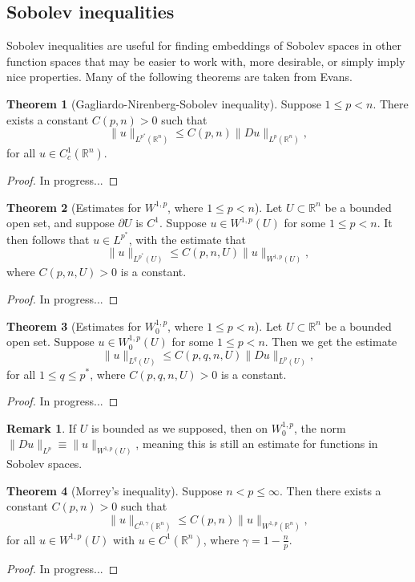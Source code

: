 \documentclass[11pt]{article}
\theoremstyle{definition}
\newtheorem*{theorem}{Theorem}
\newtheorem*{remark}{Remark}
\begin{document}
\newpage

\subsection{Sobolev inequalities}
Sobolev inequalities are useful for finding embeddings of Sobolev spaces in other function spaces that may be easier to work with, more desirable,
or simply imply nice properties. Many of the following theorems are taken from Evans.

\begin{theorem}[Gagliardo-Nirenberg-Sobolev inequality]
Suppose $1\leq p < n$. There exists a constant $C(p,n) > 0$ such that
	\[\|u\|_{L^{p^*}(\mathbb{R}^n)} \leq C(p,n)\|Du\|_{L^{p}(\mathbb{R}^n)},\]
for all $u \in C_{c}^{1}(\mathbb{R}^n)$.
\end{theorem}
\begin{proof}
In progress...
\end{proof}

\begin{theorem}[Estimates for $W^{1,p}$, where $1 \leq p < n$]
Let $U \subset \mathbb{R}^n$ be a bounded open set, and suppose $\partial U$ is $C^1$.
Suppose $u \in W^{1,p}(U)$ for some $1 \leq p < n$. It then follows that $u \in L^{p^*}$, with the estimate that
	\[\|u\|_{L^{p^*}(U)} \leq C(p,n,U)\|u\|_{W^{1,p}(U)},\]
where $C(p,n,U) > 0$ is a constant.
\end{theorem}
\begin{proof}
In progress...
\end{proof}

\begin{theorem}[Estimates for $W_{0}^{1,p}$, where $1 \leq p < n$]
Let $U \subset \mathbb{R}^n$ be a bounded open set.
	Suppose $u \in W_{0}^{1,p}(U)$ for some $1 \leq p < n$. Then we get the estimate
	\[\|u\|_{L^{q}(U)} \leq C(p,q,n,U)\|Du\|_{L^{p}(U)},\]
for all $1 \leq q \leq p^*$, where $C(p,q,n,U) > 0$ is a constant.
\end{theorem}
\begin{proof}
In progress...
\end{proof}

\begin{remark}
If $U$ is bounded as we supposed, then on $W_{0}^{1,p}$, the norm $\|Du\|_{L^{p}} \equiv \|u\|_{W^{1,p}(U)}$,
meaning this is still an estimate for functions in Sobolev spaces.
\end{remark}

\begin{theorem}[Morrey's inequality]
Suppose $n < p \leq \infty$. Then there exists a constant $C(p,n) > 0$ such that
	\[\|u\|_{C^{0,\gamma}(\mathbb{R}^n)} \leq C(p,n)\|u\|_{W^{1,p}(\mathbb{R}^n)},\]
for all $u \in W^{1,p}(U)$ with $u \in C^1(\mathbb{R}^n)$, where $\gamma = 1 - \frac{n}{p}$.
\end{theorem}
\begin{proof}
In progress...
\end{proof}
\end{document}
